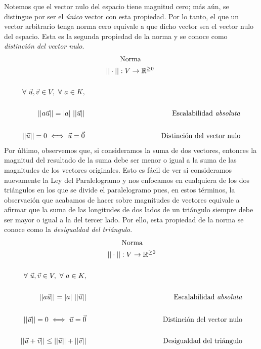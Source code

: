 \documentclass[12pt,dvipsnames]{article}
\numberwithin{equation}{section}
\begin{document}
Notemos que el vector nulo del espacio tiene magnitud cero; más aún, se distingue por ser el \emph{único} vector con esta propiedad. Por lo tanto, el que un vector arbitrario tenga norma cero equivale a que dicho vector sea el vector nulo del espacio. Esta es la segunda propiedad de la norma y se conoce como \emph{distinción del vector nulo}. %
\begin{align*}
     &\quad \quad \quad \quad \quad \text{Norma}& \\
     &\quad \quad \quad ||\cdot||:V\to \mathbb{R}^{\ge0}& \\
     \\
     \forall \ \vec{u},\vec{v}\in V, \ \forall \ a\in K, \\
    \\
    ||a\vec{u}|| = |a| \ ||\vec{u}|| &&\text{Escalabilidad \emph{absoluta}} \\
     \\
    ||\vec{u}|| = 0 \iff \vec{u} = \vec{0} &&\text{Distinción del vector nulo}
\end{align*}
Por último, observemos que, si consideramos la suma de dos vectores, entonces la magnitud del resultado de la suma debe ser menor o igual a la suma de las magnitudes de los vectores originales. Esto es fácil de ver si consideramos nuevamente la Ley del Paralelogramo y nos enfocamos en cualquiera de los dos triángulos en los que se divide el paralelogramo pues, en estos términos, la observación que acabamos de hacer sobre magnitudes de vectores equivale a afirmar que la suma de las longitudes de dos lados de un triángulo siempre debe ser mayor o igual a la del tercer lado. Por ello, esta propiedad de la norma se conoce como la \emph{desigualdad del triángulo}.
\begin{align*}
     &\quad \quad \quad \quad \quad \text{Norma}& \\
     &\quad \quad \quad ||\cdot||:V\to \mathbb{R}^{\ge0}& \\
     \\
     \forall \ \vec{u}, \vec{v}\in V, \ \forall \ a\in K, \\
    \\
    ||a\vec{u}|| = |a| \ ||\vec{u}|| &&\text{Escalabilidad \emph{absoluta}} \\
     \\
    ||\vec{u}|| = 0 \iff \vec{u} = \vec{0} &&\text{Distinción del vector nulo} \\
    \\
    ||\vec{u}+\vec{v}|| \le ||\vec{u}|| + ||\vec{v}|| &&\text{Desigualdad del triángulo}
\end{align*}
\end{document}
